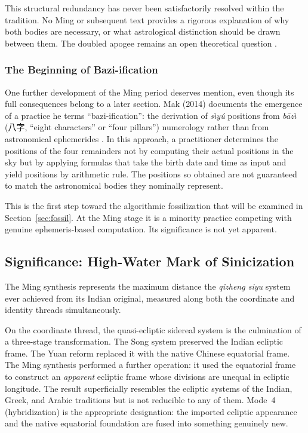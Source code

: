 \documentclass[10pt,a4paper]{article}
\newcommand{\zh}[1]{#1}
\begin{document}
This structural redundancy has never been satisfactorily resolved
within the tradition.  No Ming or subsequent text provides a rigorous
explanation of why both bodies are necessary, or what astrological
distinction should be drawn between them.  The doubled apogee
remains an open theoretical question \cite{niu2010fourremains}.

\subsubsection*{The Beginning of Bazi-ification}

One further development of the Ming period deserves mention, even
though its full consequences belong to a later section.  Mak (2014)
documents the emergence of a practice he terms ``bazi-ification'':
the derivation of \textit{s\`{\i}y\'u} positions from \textit{b\={a}z\`{\i}}
(\zh{八字}, ``eight characters'' or ``four pillars'')
numerology rather than from astronomical ephemerides
\cite{mak2014pseudoplanets}.  In this approach, a practitioner
determines the positions of the four remainders not by computing
their actual positions in the sky but by applying formulas that take
the birth date and time as input and yield positions by arithmetic
rule.  The positions so obtained are not guaranteed to match the
astronomical bodies they nominally represent.

This is the first step toward the algorithmic fossilization that
will be examined in Section~\ref{sec:fossil}.  At the Ming stage it
is a minority practice competing with genuine ephemeris-based
computation.  Its significance is not yet apparent.

\subsection*{Significance: High-Water Mark of Sinicization}

The Ming synthesis represents the maximum distance the
\textit{qizheng siyu} system ever achieved from its Indian original,
measured along both the coordinate and identity threads simultaneously.

On the coordinate thread, the quasi-ecliptic sidereal system is the culmination
of a three-stage transformation.  The Song system preserved the
Indian ecliptic frame.  The Yuan reform replaced it with the native
Chinese equatorial frame.  The Ming synthesis performed a further
operation: it used the equatorial frame to construct an
\textit{apparent} ecliptic frame whose divisions are unequal in
ecliptic longitude.  The result superficially resembles the ecliptic
systems of the Indian, Greek, and Arabic traditions but is not
reducible to any of them.  Mode~4 (hybridization) is the appropriate
designation: the imported ecliptic appearance and the native
equatorial foundation are fused into something genuinely new.
\end{document}
